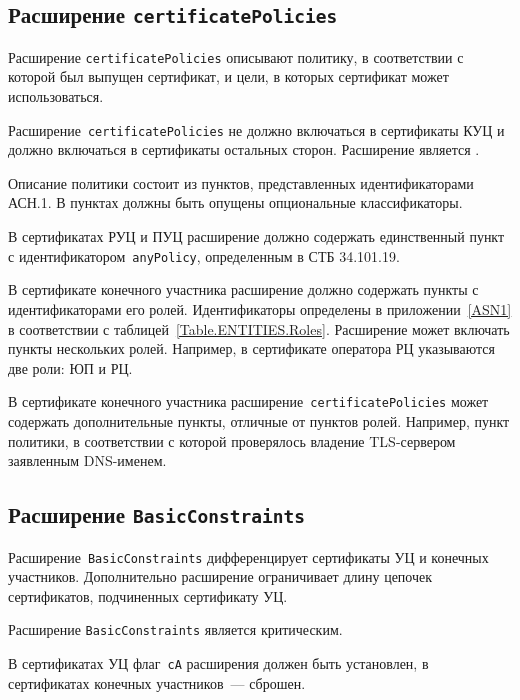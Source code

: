 
\subsection{Расширение \texttt{certificatePolicies}}\label{FMT.Ext.CP}

Расширение \texttt{certificatePolicies} описывают политику, в соответствии 
с которой был выпущен сертификат, и цели, в которых сертификат может 
использоваться. 

Расширение~\texttt{certificatePolicies} не должно включаться в сертификаты
КУЦ и должно включаться в сертификаты остальных сторон. 
Расширение является .

Описание политики состоит из пунктов, представленных идентификаторами 
АСН.1. В пунктах должны быть опущены опциональные классификаторы. 

В сертификатах РУЦ и ПУЦ расширение должно содержать единственный пункт
с идентификатором~\texttt{anyPolicy}, определенным в СТБ 34.101.19.

В сертификате конечного участника расширение 
должно содержать пункты с идентификаторами его ролей.
Идентификаторы определены в приложении~\ref{ASN1}
в соответствии с таблицей~\ref{Table.ENTITIES.Roles}. 
Расширение может включать пункты нескольких ролей.
Например, в сертификате оператора РЦ указываются две роли: ЮП и РЦ.

В сертификате конечного участника расширение~\texttt{certificatePolicies} 
может содержать дополнительные пункты, отличные от пунктов 
ролей. Например, пункт политики, в соответствии с которой 
проверялось владение TLS-сервером заявленным DNS-именем.

\subsection{Расширение \texttt{BasicConstraints}}

Расширение~\texttt{BasicConstraints} дифференцирует сертификаты УЦ и
конечных участников. Дополнительно расширение ограничивает 
длину цепочек сертификатов, подчиненных сертификату УЦ.

Расширение \texttt{BasicConstraints} является критическим.

В сертификатах УЦ флаг~\texttt{сA} расширения должен быть 
установлен, в сертификатах конечных участников~--- сброшен. 

